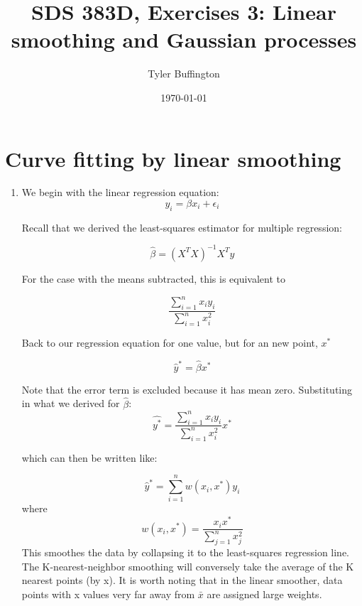 \documentclass[10pt]{article}
\begin{document}
    \title{SDS 383D, Exercises 3: Linear smoothing and Gaussian processes}
    \author{Tyler Buffington}
    \date{\today}
    \maketitle

    \section*{Curve fitting by linear smoothing}
    \begin{enumerate}[label=(\Alph*)]
    \item
    
    We begin with the linear regression equation:
    $$y_i = \beta x_i + \epsilon_i$$
       
    Recall that we derived the least-squares estimator for multiple regression:

    $$\hat{\beta} = (X^TX)^{-1}X^Ty$$

    For the case with the means subtracted, this is equivalent to 
        
    $$\frac{\sum_{i=1}^{n}x_iy_i}{\sum_{i=1}^{n}x_i^2}$$

    Back to our regression equation for one value, but for an new point, $x^*$

    $$\hat{y}^* = \hat{\beta}x^*$$

    Note that the error term is excluded because it has mean zero. Substituting in what we derived for $\hat{\beta}$:
    $$\hat{y^*} =\frac{\sum_{i=1}^{n}x_iy_i}{\sum_{i=1}^{n}x_i^2}x^*$$

    which can then be written like:

    $$\hat{y}^* = \sum_{i=1}^{n}w(x_i,x^*)y_i$$
    where
    $$w(x_i,x^*)= \frac{x_ix^*}{\sum_{j=1}^{n}x_j^2}$$
    This smoothes the data by collapsing it to the least-squares regression line. The K-nearest-neighbor smoothing will conversely take the average of the K nearest points (by x). It is worth noting that in the linear smoother, data points with x values very far away from $\bar{x}$ are assigned large weights.	


\end{enumerate}
\end{document}

